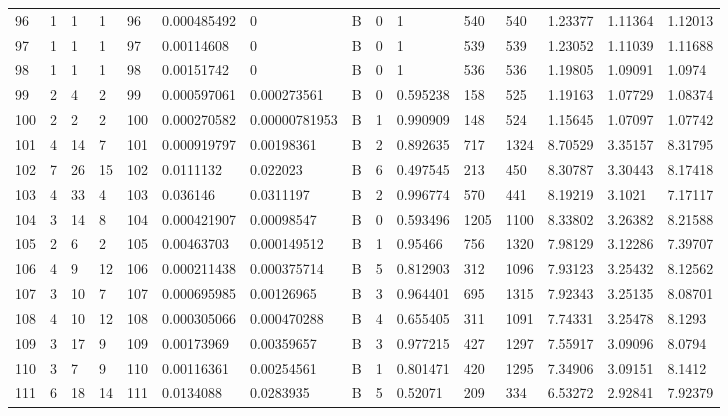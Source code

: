 \begin{latin}
\begin{longtable}{lllllllllllllll}
	96  & 1  & 1   & 1  & 96  & 0.000485492    & 0              & B & 0  & 1        & 540  & 540  & 1.23377 & 1.11364 & 1.12013 \\
	97  & 1  & 1   & 1  & 97  & 0.00114608     & 0              & B & 0  & 1        & 539  & 539  & 1.23052 & 1.11039 & 1.11688 \\
	98  & 1  & 1   & 1  & 98  & 0.00151742     & 0              & B & 0  & 1        & 536  & 536  & 1.19805 & 1.09091 & 1.0974  \\
	99  & 2  & 4   & 2  & 99  & 0.000597061    & 0.000273561    & B & 0  & 0.595238 & 158  & 525  & 1.19163 & 1.07729 & 1.08374 \\
	100 & 2  & 2   & 2  & 100 & 0.000270582    & 0.00000781953  & B & 1  & 0.990909 & 148  & 524  & 1.15645 & 1.07097 & 1.07742 \\
	101 & 4  & 14  & 7  & 101 & 0.000919797    & 0.00198361     & B & 2  & 0.892635 & 717  & 1324 & 8.70529 & 3.35157 & 8.31795 \\
	102 & 7  & 26  & 15 & 102 & 0.0111132      & 0.022023       & B & 6  & 0.497545 & 213  & 450  & 8.30787 & 3.30443 & 8.17418 \\
	103 & 4  & 33  & 4  & 103 & 0.036146       & 0.0311197      & B & 2  & 0.996774 & 570  & 441  & 8.19219 & 3.1021  & 7.17117 \\
	104 & 3  & 14  & 8  & 104 & 0.000421907    & 0.00098547     & B & 0  & 0.593496 & 1205 & 1100 & 8.33802 & 3.26382 & 8.21588 \\
	105 & 2  & 6   & 2  & 105 & 0.00463703     & 0.000149512    & B & 1  & 0.95466  & 756  & 1320 & 7.98129 & 3.12286 & 7.39707 \\
	106 & 4  & 9   & 12 & 106 & 0.000211438    & 0.000375714    & B & 5  & 0.812903 & 312  & 1096 & 7.93123 & 3.25432 & 8.12562 \\
	107 & 3  & 10  & 7  & 107 & 0.000695985    & 0.00126965     & B & 3  & 0.964401 & 695  & 1315 & 7.92343 & 3.25135 & 8.08701 \\
	108 & 4  & 10  & 12 & 108 & 0.000305066    & 0.000470288    & B & 4  & 0.655405 & 311  & 1091 & 7.74331 & 3.25478 & 8.1293  \\
	109 & 3  & 17  & 9  & 109 & 0.00173969     & 0.00359657     & B & 3  & 0.977215 & 427  & 1297 & 7.55917 & 3.09096 & 8.0794  \\
	110 & 3  & 7   & 9  & 110 & 0.00116361     & 0.00254561     & B & 1  & 0.801471 & 420  & 1295 & 7.34906 & 3.09151 & 8.1412  \\
	111 & 6  & 18  & 14 & 111 & 0.0134088      & 0.0283935      & B & 5  & 0.52071  & 209  & 334  & 6.53272 & 2.92841 & 7.92379 \\

\end{longtable}
\end{latin}
